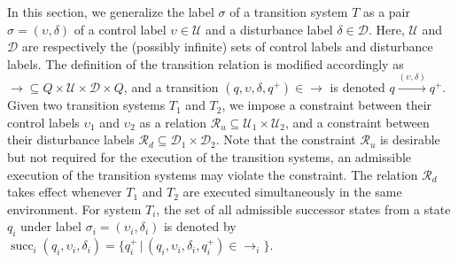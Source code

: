 In this section, we generalize the label $\sigma$ of a transition system $T$ as a pair $\sigma = (\upsilon, \delta)$ of a control label $\upsilon \in \mathcal{U}$ and a disturbance label $\delta \in \mathcal{D}$.
Here, $\mathcal{U}$ and $\mathcal{D}$ are respectively the (possibly infinite) sets of control labels and disturbance labels.
The definition of the transition relation is modified accordingly as $\rightarrow \subseteq Q \times \mathcal{U} \times \mathcal{D} \times Q$, and a transition $(q, \upsilon, \delta, q^{+}) \in \rightarrow$ is denoted $q \xrightarrow{(\upsilon, \delta)} q^{+}$.
Given two transition systems $T_{1}$ and $T_{2}$, we impose a constraint between their control labels $\upsilon_{1}$ and $\upsilon_2$ as a relation $\mathcal{R}_u \subseteq \mathcal{U}_1 \times \mathcal{U}_2$, and a constraint between their disturbance labels $\mathcal{R}_{d}\subseteq \mathcal{D}_1 \times \mathcal{D}_2$.
Note that the constraint $\mathcal{R}_{u}$ is desirable but not required for the execution of the transition systems, \ie an admissible execution of the transition systems may violate the constraint.
The relation $\mathcal{R}_{d}$ takes effect whenever $T_{1}$ and $T_{2}$ are executed simultaneously in the same environment.
For system $T_{i}$, the set of all admissible successor states from a state $q_{i}$ under label $\sigma_{i} = (\upsilon_{i}, \delta_{i})$ is denoted by $\operatorname{succ}_{i}(q_{i}, \upsilon_{i}, \delta_{i}) = \{q_{i}^{+} \,|\, (q_{i}, \upsilon_{i}, \delta_{i}, q_{i}^{+}) \in \rightarrow_{i}\}$.

